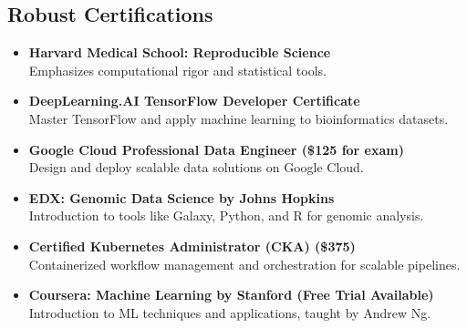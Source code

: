 \documentclass[11pt]{report}
\newcommand{\Paid}[1]{\colorbox{Paid}{#1}}
\newcommand{\Free}[1]{\colorbox{Free}{#1}}
\newcommand{\Trial}[1]{\colorbox{Trial}{#1}}
\begin{document}
\subsection*{Robust Certifications}
\begin{itemize}[label=$\Box$, leftmargin=2em]
	\item \Free{\textbf{Harvard Medical School: Reproducible Science}}  \\
	Emphasizes computational rigor and statistical tools.
	
	\item \Trial{\textbf{DeepLearning.AI TensorFlow Developer Certificate}}  \\
	Master TensorFlow and apply machine learning to bioinformatics datasets.
	
	\item \Paid{\textbf{Google Cloud Professional Data Engineer (\$125 for exam)}}  \\
	Design and deploy scalable data solutions on Google Cloud.
	
	\item \Free{\textbf{EDX: Genomic Data Science by Johns Hopkins}}  \\
	Introduction to tools like Galaxy, Python, and R for genomic analysis.
	
	\item \Paid{\textbf{Certified Kubernetes Administrator (CKA) (\$375)}}  \\
	Containerized workflow management and orchestration for scalable pipelines.
	
	\item \Trial{\textbf{Coursera: Machine Learning by Stanford (Free Trial Available)}}  \\
	Introduction to ML techniques and applications, taught by Andrew Ng.
\end{itemize}
\end{document}
